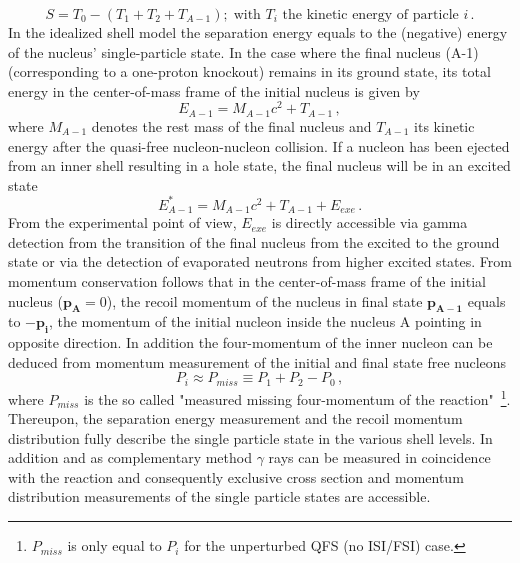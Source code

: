 \begin{equation}
S = T_0 -(T_1+T_2 +T_{A-1}); \; \text{with $T_i$ the kinetic energy of particle $i$} \, .
\label{eq:sep_e}
\end{equation}
In the idealized shell model the separation energy equals to the (negative) energy of the nucleus' single-particle state. In the case where the final nucleus (A-1) (corresponding to a one-proton knockout) remains in its ground state, its total energy in the center-of-mass frame of the initial nucleus is given by
\begin{equation}
E_{A-1} = M_{A-1}c^{2} + T_{A-1} \, ,
\end{equation}
where \( M_{A-1} \) denotes the rest mass of the final nucleus and \( T_{A-1} \) its kinetic energy after the quasi-free nucleon-nucleon collision.\newline
If a nucleon has been ejected from an inner shell resulting in a hole state, the final nucleus will be in an excited state
\begin{equation}
E^{*}_{A-1} =  M_{A-1}c^2  +T_{A-1} + E_{exe} \, .
\end{equation} 
From the experimental point of view, $E_{exe}$ is directly accessible via gamma detection from the transition of the final nucleus from the excited to the ground state or via the detection of evaporated neutrons from higher excited states.\newline
From momentum conservation follows that in the center-of-mass frame of the initial nucleus ($\mathbf{p_A} = 0$), the recoil momentum of the nucleus in final state $\mathbf{p_{A-1}}$ equals to $-\mathbf{p_i}$, the momentum of the initial nucleon inside the nucleus A pointing in opposite direction. \newline
In addition the four-momentum of the inner nucleon can be deduced from momentum measurement of the initial and final state free nucleons
\begin{equation}\label{eq:miss_mom}
P_i \approx P_{miss} \equiv P_1 + P_2  - P_0 \, ,
\end{equation}
where $P_{miss}$ is the so called "measured missing four-momentum of the reaction"~\cite{patsyuk2021unperturbed}\footnote{$P_{miss}$ is only equal to $P_i$ for the unperturbed QFS (no ISI/FSI) case.}.
Thereupon, the separation energy measurement and the recoil momentum distribution fully describe the single particle state in the various shell levels. 
In addition and as complementary method $\gamma$ rays can be measured in coincidence with the reaction and consequently exclusive cross section and momentum distribution measurements of the single particle states are accessible.\newline
